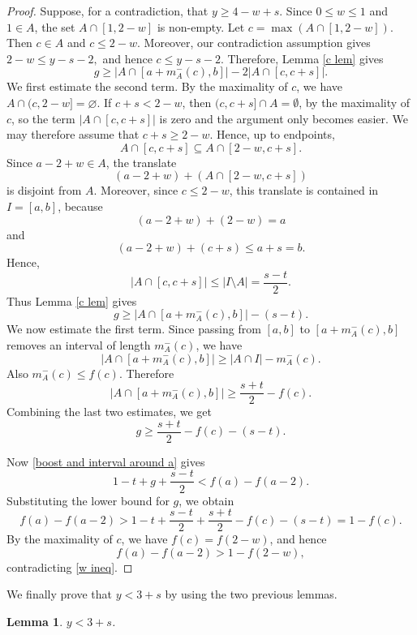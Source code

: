 \documentclass[11pt,reqno]{amsart}
\newtheorem{lem}[thm]{Lemma}
\theoremstyle{definition}
\def\F#1{f(#1)}
\begin{document}
\begin{proof}
    Suppose, for a contradiction, that $y\geq 4-w+s$. Since $0\leq w\leq 1$
    and $1\in A$, the set $A\cap[1,2-w]$ is non-empty. Let $ c=\max(A\cap[1,2-w])$. Then $c\in A$ and $c\leq 2-w$. Moreover, our contradiction assumption gives $ 2-w\leq y-s-2, $
    and hence $c\leq y-s-2$. Therefore,   Lemma \ref{c lem} gives
    $$
        g\geq |A\cap [a+m_A^-(c),b]|-2|A\cap[c,c+s]|.
    $$
    We first estimate the second term. By the maximality of $c$, we have $A\cap(c,2-w]=\varnothing$.
    If $c+s<2-w$, then $(c,c+s]\cap A=\emptyset$, by the maximality of $c$, so the term $|A\cap[c,c+s]|$ is zero and the argument only becomes easier. We may
therefore assume that $c+s\geq 2-w$. Hence, up to endpoints,
$$
    A\cap[c,c+s]\subseteq A\cap[2-w,c+s].
$$
     Since $a-2+w\in A$, the translate
    $$
        (a-2+w)+(A\cap[2-w,c+s])
    $$
    is disjoint from $A$. Moreover, since $c\leq 2-w$, this translate is
    contained in $I=[a,b]$, because
    $$
        (a-2+w)+(2-w)=a
    $$
    and
    $$
        (a-2+w)+(c+s)\leq a+s=b.
    $$
    Hence,  
    $$
        |A\cap[c,c+s]|
        \leq
        |I\setminus A|
        =
        \frac{s-t}{2}.
    $$
    Thus Lemma \ref{c lem} gives
    $$
        g\geq |A\cap [a+m_A^-(c),b]|-(s-t).
    $$
    We now estimate the first term. Since passing from $[a,b]$ to
    $[a+m_A^-(c),b]$ removes an interval of length $m_A^-(c)$, we have
    $$
        |A\cap [a+m_A^-(c),b]|
        \geq
        |A\cap I|-m_A^-(c).
    $$
    Also $m_A^-(c)\leq \F{c}$. Therefore
    $$
        |A\cap [a+m_A^-(c),b]|
        \geq
        \frac{s+t}{2}-\F{c}.
    $$
    Combining the last two estimates, we get
    $$
        g\geq \frac{s+t}{2}-\F{c}-(s-t).
    $$

    Now \eqref{boost and interval around a} gives
    $$
        1-t+g+\frac{s-t}{2}<\F{a}-\F{a-2}.
    $$
    Substituting the lower bound for $g$, we obtain
    $$
        \F{a}-\F{a-2}
        >
        1-t+\frac{s-t}{2}+\frac{s+t}{2}-\F{c}-(s-t)
        =
        1-\F{c}.
    $$
    By the maximality of $c$, we have $\F{c}=\F{2-w}$, and hence
    $$
        \F{a}-\F{a-2}>1-\F{2-w},
    $$
    contradicting \eqref{w ineq}.
\end{proof}
We finally prove that $y< 3+s$ by using the two previous lemmas.
\begin{lem}
    $y < 3 + s$. 
\end{lem}
\end{document}
